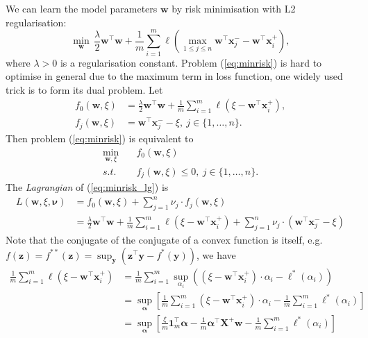 \documentclass[9pt]{extarticle}
\newcommand{\x}{\mathbf{x}}
\newcommand{\X}{\mathbf{X}}
\newcommand{\y}{\mathbf{y}}
\newcommand{\z}{\mathbf{z}}
\newcommand{\1}{\mathbf{1}}
\newcommand{\w}{\mathbf{w}}
\newcommand{\alphabm}{\bm{\alpha}}
\newcommand{\nubm}{\bm{\nu}}
\newcommand{\eg}{e.g.\ }
\begin{document}
We can learn the model parameters $\w$ by risk minimisation with L2 regularisation:
\begin{equation}
\label{eq:minrisk}
\min_{\w} \, \frac{\lambda}{2} \w^\top \w + \frac{1}{m} \sum_{i=1}^m \ell\left( \max_{1 \le j \le n} \w^\top \x_j^- - \w^\top \x_i^+ \right),
\end{equation}
where $\lambda > 0$ is a regularisation constant.
Problem (\ref{eq:minrisk}) is hard to optimise in general due to the maximum term in loss function, one widely used trick is to form its dual problem.
Let 
\begin{equation*}
\begin{aligned}
f_0 (\w, \xi) &= \frac{\lambda}{2} \w^\top \w + \frac{1}{m} \sum_{i=1}^m \ell\left( \xi - \w^\top \x_i^+ \right), \\
f_j (\w, \xi) &= \w^\top \x_j^- - \xi, \ j \in \{1,\dots,n\}.
\end{aligned}
\end{equation*}
Then problem (\ref{eq:minrisk}) is equivalent to
\begin{equation}
\label{eq:minrisk_lg}
\begin{aligned}
\min_{\w, \xi} \quad & f_0 (\w, \xi) \\
s.t. \quad & f_j (\w, \xi) \le 0, \ j \in \{1,\dots,n\}.
\end{aligned}
\end{equation}
The \emph{Lagrangian} of (\ref{eq:minrisk_lg}) is
\begin{equation}
\label{eq:minrisk_lg1}
\begin{aligned}
L(\w, \xi, \nubm) 
&= f_0 (\w, \xi) + \sum_{j=1}^n \nu_j \cdot f_j(\w, \xi) \\
&= \frac{\lambda}{2} \w^\top \w + \frac{1}{m} \sum_{i=1}^m \ell\left( \xi - \w^\top \x_i^+ \right) + \sum_{j=1}^n \nu_j \cdot \left( \w^\top \x_j^- - \xi \right)
\end{aligned}
\end{equation}
Note that the conjugate of the conjugate of a convex function is itself, \eg $f(\z) = f^{**}(\z) = \sup_{\y} \left( \z^\top \y - f^*(\y) \right)$, we have
\begin{equation}
\label{eq:lg_part1}
\begin{aligned}
\frac{1}{m} \sum_{i=1}^m \ell\left( \xi - \w^\top \x_i^+ \right)
&= \frac{1}{m} \sum_{i=1}^m \sup_{\alpha_i} \left( (\xi - \w^\top \x_i^+) \cdot \alpha_i - \ell^*(\alpha_i) \right) \\
&= \sup_{\alphabm} \left[ \frac{1}{m} \sum_{i=1}^m (\xi - \w^\top \x_i^+) \cdot \alpha_i - \frac{1}{m} \sum_{i=1}^m \ell^*(\alpha_i) \right] \\
&= \sup_{\alphabm} \left[ \frac{\xi}{m} \1_m^\top \alphabm - \frac{1}{m} \alphabm^\top \X^+ \w - \frac{1}{m} \sum_{i=1}^m \ell^*(\alpha_i) \right] \\
\end{aligned}
\end{equation}
\end{document}

